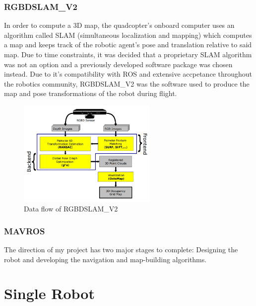 \documentclass[letterpaper, oneside, 10pt]{report}
\begin{document}
\subsection{RGBDSLAM\_V2}
\noindent In order to compute a 3D map, the quadcopter's onboard computer uses an algorithm called SLAM (simultaneous localization and mapping) which computes a map and keeps track of the robotic agent's pose and translation relative to said map. Due to time constraints, it was decided that a proprietary SLAM algorithm was not an option and a previously developed software package was chosen instead. Due to it's compatibility with ROS and extensive accpetance throughout the robotics community, RGBDSLAM_V2 was the software used to produce the map and pose transformations of the robot during flight.

\begin{figure}[h]
 \caption{Data flow of RGBDSLAM_V2}
 \centering
   \includegraphics[width=0.6\textwidth]{images/rgbdslam}
\end{figure}

\subsection{MAVROS}

The direction of my project has two major stages to complete: Designing the robot and developing the navigation and map-building algorithms. \\


\chapter{Single Robot}
\end{document}

